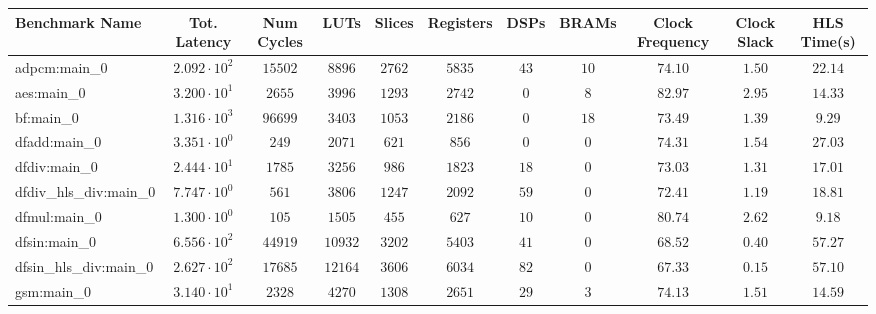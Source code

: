 \begin{tabular}{|l|c|c|c|c|c|c|c|c|c|c|}
\hline
Benchmark Name          & Tot. Latency           & Num Cycles & LUTs      & Slices    & Registers & DSPs    & BRAMs   & Clock Frequency & Clock Slack & HLS Time(s) \\
\hline
adpcm:main\_0           & $ 2.092 \cdot 10^{2} $ & $ 15502  $ & $ 8896  $ & $ 2762  $ & $ 5835  $ & $ 43  $ & $ 10  $ & $ 74.10       $ & $ 1.50    $ & $ 22.14   $ \\
aes:main\_0             & $ 3.200 \cdot 10^{1} $ & $ 2655   $ & $ 3996  $ & $ 1293  $ & $ 2742  $ & $ 0   $ & $ 8   $ & $ 82.97       $ & $ 2.95    $ & $ 14.33   $ \\
bf:main\_0              & $ 1.316 \cdot 10^{3} $ & $ 96699  $ & $ 3403  $ & $ 1053  $ & $ 2186  $ & $ 0   $ & $ 18  $ & $ 73.49       $ & $ 1.39    $ & $ 9.29    $ \\
dfadd:main\_0           & $ 3.351 \cdot 10^{0} $ & $ 249    $ & $ 2071  $ & $ 621   $ & $ 856   $ & $ 0   $ & $ 0   $ & $ 74.31       $ & $ 1.54    $ & $ 27.03   $ \\
dfdiv:main\_0           & $ 2.444 \cdot 10^{1} $ & $ 1785   $ & $ 3256  $ & $ 986   $ & $ 1823  $ & $ 18  $ & $ 0   $ & $ 73.03       $ & $ 1.31    $ & $ 17.01   $ \\
dfdiv\_hls\_div:main\_0 & $ 7.747 \cdot 10^{0} $ & $ 561    $ & $ 3806  $ & $ 1247  $ & $ 2092  $ & $ 59  $ & $ 0   $ & $ 72.41       $ & $ 1.19    $ & $ 18.81   $ \\
dfmul:main\_0           & $ 1.300 \cdot 10^{0} $ & $ 105    $ & $ 1505  $ & $ 455   $ & $ 627   $ & $ 10  $ & $ 0   $ & $ 80.74       $ & $ 2.62    $ & $ 9.18    $ \\
dfsin:main\_0           & $ 6.556 \cdot 10^{2} $ & $ 44919  $ & $ 10932 $ & $ 3202  $ & $ 5403  $ & $ 41  $ & $ 0   $ & $ 68.52       $ & $ 0.40    $ & $ 57.27   $ \\
dfsin\_hls\_div:main\_0 & $ 2.627 \cdot 10^{2} $ & $ 17685  $ & $ 12164 $ & $ 3606  $ & $ 6034  $ & $ 82  $ & $ 0   $ & $ 67.33       $ & $ 0.15    $ & $ 57.10   $ \\
gsm:main\_0             & $ 3.140 \cdot 10^{1} $ & $ 2328   $ & $ 4270  $ & $ 1308  $ & $ 2651  $ & $ 29  $ & $ 3   $ & $ 74.13       $ & $ 1.51    $ & $ 14.59   $ \\

\end{tabular}
